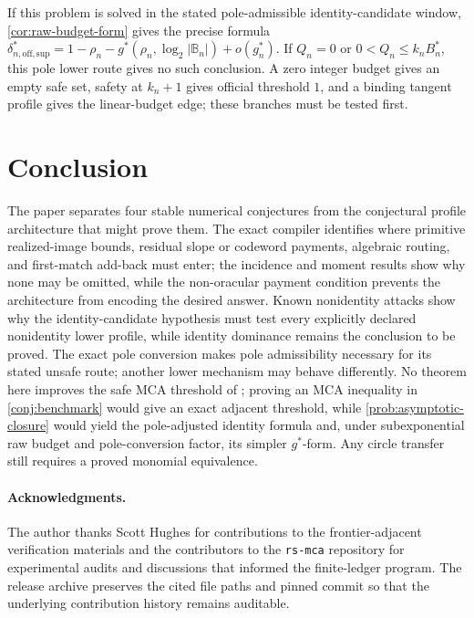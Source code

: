 \documentclass[a4paper,11pt]{amsart}
\theoremstyle{remark}
\newcommand{\B}{\mathbb B}
\newcommand{\abs}[1]{\lvert#1\rvert}
\begin{document}
If this problem is solved in the stated pole-admissible identity-candidate window,
\cref{cor:raw-budget-form} gives the precise formula
\(\delta_{n,\mathrm{off,sup}}^*=1-\rho_n-
g^*(\rho_n,\log_2\abs{\B_n})+o(g_n^*)\).  If
\(Q_n=0\) or \(0<Q_n\le k_nB_n^*\), this pole lower route gives no such
conclusion.  A zero
integer budget gives an empty safe set, safety at \(k_n+1\) gives official
threshold \(1\), and a binding tangent profile gives the linear-budget edge;
these branches must be tested first.

\section{Conclusion}\label{sec:conclusion}

The paper separates four stable numerical conjectures from the conjectural
profile architecture that might prove them.  The exact compiler identifies
where primitive realized-image bounds, residual slope or codeword payments,
algebraic routing, and first-match add-back must enter; the incidence and
moment results show why none may be omitted, while the non-oracular payment
condition prevents the architecture from encoding the desired answer.
Known nonidentity attacks show why the identity-candidate hypothesis must
test every explicitly declared nonidentity lower profile, while identity
dominance remains the conclusion to be proved.  The exact pole conversion
makes pole admissibility necessary for its stated unsafe route; another
lower mechanism may behave differently.  No theorem here improves the
safe MCA threshold of \cite{ChoShortening}; proving an MCA inequality in
\cref{conj:benchmark} would give an exact adjacent threshold, while
\cref{prob:asymptotic-closure} would yield the pole-adjusted identity formula
and, under subexponential raw budget and pole-conversion factor, its simpler
\(g^*\)-form.  Any
circle transfer still requires a proved monomial equivalence.

\paragraph{Acknowledgments.}
The author thanks Scott Hughes for contributions to the frontier-adjacent
verification materials and the contributors to the \texttt{rs-mca}
repository for experimental audits and discussions that informed the
finite-ledger program.  The release archive preserves the cited file paths
and pinned commit so that the underlying contribution history remains
auditable.
\end{document}
